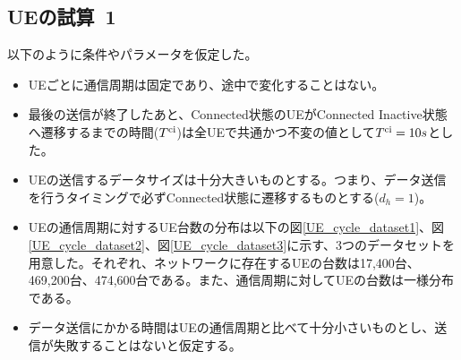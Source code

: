 \documentclass[a4j]{ujarticle}
\begin{document}
\subsection{UEの試算~1}
\label{sec:estimate1}
以下のように条件やパラメータを仮定した。
\begin{itemize}
  \item UEごとに通信周期は固定であり、途中で変化することはない。
  \item 最後の送信が終了したあと、Connected状態のUEがConnected Inactive状態へ遷移するまでの時間($T^{\rm ci}$)は全UEで共通かつ不変の値として$T^{\rm ci} = 10s$とした。
  \item UEの送信するデータサイズは十分大きいものとする。つまり、データ送信を行うタイミングで必ずConnected状態に遷移するものとする($d_h = 1$)。
  \item UEの通信周期に対するUE台数の分布は以下の図\ref{UE_cycle_dataset1}、図\ref{UE_cycle_dataset2}、図\ref{UE_cycle_dataset3}に示す、3つのデータセットを用意した。それぞれ、ネットワークに存在するUEの台数は17,400台、469,200台、474,600台である。また、通信周期に対してUEの台数は一様分布である。
  \item データ送信にかかる時間はUEの通信周期と比べて十分小さいものとし、送信が失敗することはないと仮定する。
\end{itemize}
\end{document}
